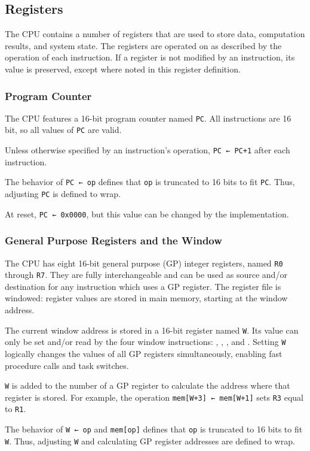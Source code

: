 \documentclass[12pt,a4paper]{article}
\begin{document}
\subsection{Registers}
The CPU contains a number of registers that are used to store data, computation results, and system state. The registers are operated on as described by the operation of each instruction. If a register is not modified by an instruction, its value is preserved, except where noted in this register definition.

\subsubsection{Program Counter}
The CPU features a 16-bit program counter named \texttt{PC}. All instructions are 16 bit, so all values of \texttt{PC} are valid.

Unless otherwise specified by an instruction's operation, \texttt{PC ← PC+1} after each instruction.

The behavior of \texttt{PC ← op} defines that \texttt{op} is truncated to 16 bits to fit \texttt{PC}. Thus, adjusting \texttt{PC} is defined to wrap.

At reset, \texttt{PC ← 0x0000}, but this value can be changed by the implementation.

\subsubsection{General Purpose Registers and the Window}
The CPU has eight 16-bit general purpose (GP) integer registers, named \texttt{R0} through \texttt{R7}. They are fully interchangeable and can be used as source and/or destination for any instruction which uses a GP register. The register file is windowed: register values are stored in main memory, starting at the window address.

The current window address is stored in a 16-bit register named \texttt{W}. Its value can only be set and/or read by the four window instructions: , , , and . Setting \texttt{W} logically changes the values of all GP registers simultaneously, enabling fast procedure calls and task switches.

\texttt{W} is added to the number of a GP register to calculate the address where that register is stored. For example, the operation \texttt{mem[W+3] ← mem[W+1]} sets \texttt{R3} equal to \texttt{R1}.

The behavior of \texttt{W ← op} and \texttt{mem[op]} defines that \texttt{op} is truncated to 16 bits to fit \texttt{W}. Thus, adjusting \texttt{W} and calculating GP register addresses are defined to wrap.
\end{document}
